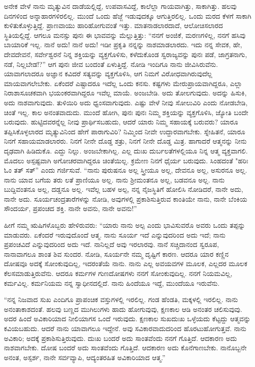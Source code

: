ಅನೇಕ ವೇಳೆ ನಾನು ಮೃತ್ಯುವಿನ ದಾಡೆಯಲ್ಲಿದ್ದೆ, ಉಪವಾಸವಿದ್ದೆ, ಕಾಲೆಲ್ಲಾ ಗಾಯವಾಗಿತ್ತು, ಸಾಕಾಗಿತ್ತು. ಹಲವು ದಿನಗಳಿಂದ ಅನ್ನಾಹಾರಗಳಿರಲಿಲ್ಲ. ಮುಂದೆ ಒಂದು ಹೆಜ್ಜೆ ಇಡುವುದಕ್ಕೂ ಆಗುತ್ತಿರಲಿಲ್ಲ. ಒಂದು ಮರದ ಕೆಳಗೆ ಸಾಕಾಗಿ ಕುಳಿತುಕೊಳ್ಳುತ್ತಿದ್ದೆ. ಪ್ರಾಣವಾಯು ಹಾರಿಹೋಗುವಂತೆ ಇತ್ತು. ಮಾತನಾಡಲಾರದಾದೆ, ಆಲೋಚಿಸಲಾರದ ಸ್ಥಿತಿಯಲ್ಲಿದ್ದೆ. ಆಗಲೂ ಮನಸ್ಸು ಪುನಃ ಈ ಭಾವವನ್ನು ಮೆಲ್ಲುತ್ತಿತ್ತು: “ನನಗೆ ಅಂಜಿಕೆ, ಮರಣಗಳಿಲ್ಲ, ನನಗೆ ಹಸಿವು ಬಾಯಾರಿಕೆ ಇಲ್ಲ. ನಾನೆ ಅದು! ನಾನೆ ಅದು! ಇಡೀ ಪ್ರಕೃತಿ ನನ್ನನ್ನು ನಾಶಮಾಡಲಾರದು. ಇದು ನನ್ನ ಸೇವಕ, ಹೇ, ದೇವದೇವನೆ, ಸರ್ವೇಶ್ವರನೆ ನಿನ್ನ ಶಕ್ತಿಯನ್ನು ವ್ಯಕ್ತಗೊಳಿಸು, ಕಳೆದುಕೊಂಡ ಸ್ವರಾಜ್ಯವನ್ನು ಪುನಃ ಪಡೆ, ಜಾಗ್ರತನಾಗು, ನಡೆ, ನಿಲ್ಲಬೇಡ!?” ಆಗ ಪುನಃ ಜೀವ ಬಂದಂತೆ ಏಳುತ್ತಿದ್ದೆ. ನೋಡಿ ಇಂದಿಗೂ ನಾನು ಜೀವಿಸಿರುವೆನು. ಯಾವಾಗಲಾದರೂ ಅಜ್ಞಾನ ಕವಿದರೆ ಸತ್ಯವನ್ನು ವ್ಯಕ್ತಗೊಳಿಸಿ, ಆಗ ನಿಮಗೆ ವಿರೋಧವಾಗಿರುವುದೆಲ್ಲ ಮಾಯವಾಗಲೇಬೇಕು. ಏಕೆಂದರೆ ಎಷ್ಟಾದರೂ ಇದೆಲ್ಲ ಒಂದು ಕನಸು. ಕಷ್ಟಗಳು ಮೇರುಪ್ರಾಯವಾಗಿದ್ದರೂ, ಎಲ್ಲಾ ನಿರಾಶಾಸೂಚಕವಾಗಿ ಭಯಂಕರವಾಗಿದ್ದರೂ ಇವೆಲ್ಲ ಮಾಯೆ. ಅಂಜಬೇಡಿ. ಅದು ತೋಲಗುವುದು. ಅದನ್ನು ಹಿಸುಕಿ, ಅದು ನಾಶವಾಗುವುದು. ತುಳಿಯಿರಿ ಅದು ಧ್ವಂಸವಾಗುವುದು. ಎಷ್ಟು ವೇಳೆ ನೀವು ಸೋಲುವಿರಿ ಎಂದು ನೋಡಬೇಡಿ, ಚಿಂತೆ ಇಲ್ಲ. ಕಾಲ ಅನಂತವಾದುದು. ಮುಂದೆ ಹೋಗಿ, ಪುನಃ ಪುನಃ ನಿಮ್ಮ ಶಕ್ತಿಯನ್ನು ವ್ಯಕ್ತಗೊಳಿಸಿ, ಜ್ಯೋತಿ ಬಂದೇ ಬರುವುದು. ಹುಟ್ಟಿದವರನ್ನೆಲ್ಲ ನೀವು ಪ್ರಾರ್ಥಿಸಬಹುದು, ಆದರೆ ಯಾರು ನಿಮ್ಮ ಸಹಾಯಕ್ಕೆ ಬರುವರು? ಯಾರೂ ತಪ್ಪಿಸಿಕೊಳ್ಳಲಾರದ ಮೃತ್ಯುವಿನಿಂದ ಹೇಗೆ ಪಾರಾಗುವಿರಿ? ನಿಮ್ಮಿಂದ ನೀವೇ ಉದ್ದಾರವಾಗಬೇಕು. ಸ್ನೇಹಿತನೆ, ಯಾರೂ ನಿನಗೆ ಸಹಾಯಮಾಡಲಾರರು. ನಿನಗೆ ನೀನೇ ದೊಡ್ಡ ಶತ್ರು, ನಿನಗೆ ನೀನೇ ದೊಡ್ಡ ಮಿತ್ರ. ಹಾಗಾದರೆ ಆತ್ಮನನ್ನು ನೀನು ದೃಢವಾಗಿ ಹಿಡಿದುಕೊ. ಎದ್ದು ನಿಲ್ಲು. ಅಂಜಬೇಕಾಗಿಲ್ಲ. ಎಲ್ಲ ದುಃಖ ದುರ್ಬಲತೆಗಳಲ್ಲಿಯೂ ನಿನ್ನ ಆತ್ಮ ವ್ಯಕ್ತವಾಗಲಿ. ಮೊದಲು ಅಸ್ಪಷ್ಟವಾಗಿ ಅಗೋಚರವಾಗಿದ್ದರೂ ಚಿಂತೆಯಿಲ್ಲ. ಕ್ರಮೇಣ ನಿನಗೆ ಧೈರ್ಯ ಬರುವುದು. ಸಿಂಹದಂತೆ "ಹರಿಃ ಓಂ ತತ್ ಸತ್'' ಎಂದು ಗರ್ಜಿಸುವೆ. “ನಾನು ಪುರುಷನೂ ಅಲ್ಲ ಸ್ತ್ರೀಯೂ ಅಲ್ಲ, ದೇವನೂ ಅಲ್ಲ, ಅಸುರನೂ ಅಲ್ಲ. ನಾನು ಯಾವ ಬಗೆಯ ತರು ಲತೆ ಪ್ರಾಣಿಯೂ ಅಲ್ಲ. ನಾನು ಶ‍್ರೀಮಂತನೂ ಅಲ್ಲ, ಬಡವನೂ ಅಲ್ಲ. ನಾನು ಬುದ್ದಿವಂತನೂ ಅಲ್ಲ, ದಡ್ಡನೂ ಅಲ್ಲ. ಇವೆಲ್ಲ ಬಹಳ ಅಲ್ಪ, ನನ್ನ ನೈಜಸ್ಥಿತಿಗೆ ಹೋಲಿಸಿ ನೋಡಿದರೆ, ನಾನೇ ಅದು, ನಾನೇ ಅದು. ಸೂರ್ಯಚಂದ್ರತಾರೆಗಳನ್ನು ನೋಡಿ, ಅವುಗಳಲ್ಲಿ ಪ್ರಕಾಶಿಸುತ್ತಿರುವ ಕಾಂತಿಯೇ ನಾನು, ನಾನೇ ಬೆಂಕಿಯ ಸೌಂದರ್ಯ, ಪ್ರಪಂಚದ ಶಕ್ತಿ. ನಾನೇ ಅವನು, ನಾನೇ ಅವನು!”

ಹೀಗೆ ನಮ್ಮ ಋಷಿಗಳೊಬ್ಬರು ಹೇಳಿರುವರು: “ಯಾರು ನಾನು ಅಲ್ಪ ಎಂದು ಭಾವಿಸುವರೊ ಅವರು ಒಂದು ತಪ್ಪನ್ನು ಮಾಡುವರು. ಏಕೆಂದರೆ ಇರುವುದೊಂದೆ ಆತ್ಮ. ನಾನು ಸೂರ್ಯ ಇದೆ ಎನ್ನುವುದರಿಂದ ಅದು ಇದೆ; ನಾನು ಪ್ರಪಂಚವಿದೆ ಎನ್ನುವುದರಿಂದ ಅದು ಇದೆ. ನಾನಿಲ್ಲದೆ ಅವು ಇರಲಾರವು. ನಾನೆ ಸಚ್ಚಿದಾನಂದ ಸ್ವರೂಪ, ನಾನಾವಾಗಲೂ ಶಾಂತ ಶಿವ ಸುಂದರ. ನೋಡಿ, ಸೂರ್ಯನೇ ನಮ್ಮ ದೃಷ್ಟಿಗೆ ಕಾರಣ. ಆದರೂ ಯಾರ ಕಣ್ಣಿನ ದೋಷವೂ ಅದಕ್ಕೆ ಸೋಂಕುವುದಿಲ್ಲ, ಇದರಂತೆಯೆ ನಾನು. ನಾನು ಎಲ್ಲ ಅವಯವಗಳ ಮೂಲಕ, ಎಲ್ಲದರ ಮೂಲಕ ಕೆಲಸಮಾಡುತ್ತಿರುವೆನು. ಆದರೂ ಕರ್ಮಗಳ ಗುಣದೋಷಗಳು ನನಗೆ ಸೋಂಕುವುದಿಲ್ಲ. ನನಗೆ ನಿಯಮವಿಲ್ಲ, ಕರ್ಮವಿಲ್ಲ. ಕರ್ಮನಿಯಮ ನನ್ನ ಸ್ವಾಧೀನದಲ್ಲಿದೆ. ನಾನು ಹಿಂದೆಯೂ ಇದ್ದೆ, ಮುಂದೆಯೂ ಇರುವೆನು.

“ನನ್ನ ನಿಜವಾದ ಸುಖ ಎಂದಿಗೂ ಪ್ರಾಪಂಚಿಕ ವಸ್ತುಗಳಲ್ಲಿ ಇರಲಿಲ್ಲ. ಗಂಡ ಹೆಂಡತಿ, ಮಕ್ಕಳಲ್ಲಿ ಇರಲಿಲ್ಲ. ನಾನು ಅನಂತಾಕಾಶದಂತೆ. ಹಲವು ಬಣ್ಣದ ಮುಗಿಲುಗಳು ಹಾದು ಹೋಗುವುವು, ಕ್ಷಣಕಾಲ ಆಡಿ ಅನಂತರ ಚಲಿಸುವುವು. ಅದರ ಹಿಂದೆ ಅವಿಕಾರಿಯಾದ ನೀಲಿಯಾಗಸ ಒಂದೆ ಇರುವುದು. ಕ್ಷಣಕಾಲ ಸುಖದುಃಖ ಒಳ್ಳೆಯದು ಕೆಟ್ಟದ್ದು ಆತ್ಮವನ್ನು ಕವಿಯಬಹುದು. ಆದರೆ ನಾನು ಯಾವಾಗಲೂ ಇದ್ದೇನೆ. ಅವು ಸವಿಕಾರವಾದುದರಿಂದ ಹೊರಟುಹೋಗುತ್ತವೆ. ನಾನು ಅವಿಕಾರಿ; ಅದಕ್ಕೆ ಪ್ರಕಾಶಿಸುತ್ತಿರುವುದು. ದುಃಖ ಬಂದರೆ ಅದು ಸಾಂತವೆಂದು ನನಗೆ ಗೊತ್ತಿದೆ. ಆದಕಾರಣ ಅದು ನಾಶವಾಗಬೇಕು. ದೋಷ ಬಂದರೆ ಅದು ಸಾಂತವೆಂದು ಗೊತ್ತಿದೆ. ಆದಕಾರಣ ಅದು ಕೊನೆಗಾಣಬೇಕು. ನಾನೊಬ್ಬನೇ ಅನಂತ, ಅಸ್ಪರ್ಶ, ನಾನೇ ಸರ್ವವ್ಯಾಪಿ, ಆದ್ಯಂತರಹಿತ ಅವಿಕಾರಿಯಾದ ಆತ್ಮ.''

